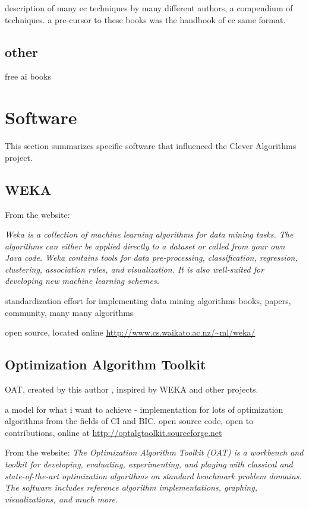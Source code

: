 \documentclass[a4paper, 11pt]{article}
\begin{document}
description of many ec techniques by many different authors, a compendium of techniques. a pre-cursor to these books was the handbook of ec \cite{Baeck1997} same format.  

\subsection{other}
free ai books



\section{Software}
\label{sec:software}
This section summarizes specific software that influenced the Clever Algorithms project.

\subsection{WEKA}
From the website: 

\emph{Weka is a collection of machine learning algorithms for data mining tasks. The algorithms can either be applied directly to a dataset or called from your own Java code. Weka contains tools for data pre-processing, classification, regression, clustering, association rules, and visualization. It is also well-suited for developing new machine learning schemes.}



standardization effort for implementing data mining algorithms \cite{Hall2009}
books, papers, community, many many algorithms

open source, located online \url{http://www.cs.waikato.ac.nz/~ml/weka/}

\subsection{Optimization Algorithm Toolkit}
OAT, created by this author \cite{Brownlee2007}, inspired by WEKA and other projects.

a model for what i want to achieve - implementation for lots of optimization algorithms from the fields of CI and BIC. open source code, open to contributions, online at \url{http://optalgtoolkit.sourceforge.net}

From the website: 
\emph{The Optimization Algorithm Toolkit (OAT) is a workbench and toolkit for developing, evaluating, experimenting, and playing with classical and state-of-the-art optimization algorithms on standard benchmark problem domains. The software includes reference algorithm implementations, graphing, visualizations, and much more.}
\end{document}
